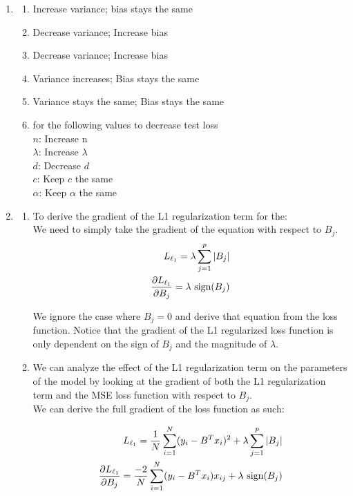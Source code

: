 \documentclass[12pt]{article}
\begin{document}
\begin{enumerate}
\item 
\begin{enumerate}
\item Increase variance; bias stays the same
\item Decrease variance; Increase bias
\item Decrease variance; Increase bias 
\item Variance increases; Bias stays the same 
\item Variance stays the same; Bias stays the same 
\item for the following values to decrease test loss\\
    $n$: Increase n \\ 
    $\lambda$: Increase $\lambda$ \\ 
    $d$: Decrease $d$ \\ 
    $c$: Keep $c$ the same \\ 
    $\alpha$: Keep $\alpha$ the same 
\end{enumerate}

\item
\begin{enumerate}
\item To derive the gradient of the L1 regularization term for the: \\ 
We need to simply take the gradient of the equation with respect to $B_j$. 
\begin{align}
  L_{\ell_1} = \lambda \sum_{j=1}^{p} |B_j| \notag \\ 
  \frac{\partial L_{\ell_1}}{\partial B_j} = \lambda \text{ sign} (B_j) \notag
\end{align}

We ignore the case where $B_j = 0$ and derive that equation from the loss function. Notice that the gradient of the L1 regularized loss function
is only dependent on the sign of $B_j$ and the magnitude of $\lambda$.

\item  We can analyze the effect of the L1 regularization term on the parameters of the model by looking 
at the gradient of both the L1 regularization term and the MSE loss function with respect to $B_j$. \\ 

We can derive the full gradient of the loss function as such: 

\begin{align}
  L_{\ell_1} = \frac{1}{N} \sum_{i=1}^{N} (y_i - B^T x_i)^2 + \lambda \sum_{j=1}^{p} |B_j| \notag \\ 
  \frac{\partial L_{\ell_1}}{\partial B_j} = \frac{-2}{N} \sum_{i=1}^{N} (y_i - B^T x_i)x_{ij} + \lambda \text{ sign}(B_j) \notag
\end{align}


\end{enumerate}
\end{enumerate}
\end{document}
